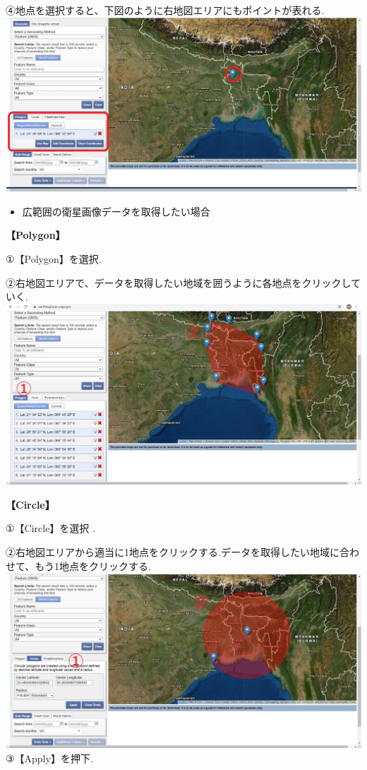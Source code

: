 \documentclass[
]{book}
\providecommand{\tightlist}{%
  \setlength{\itemsep}{0pt}\setlength{\parskip}{0pt}}
\begin{document}
④地点を選択すると、下図のように右地図エリアにもポイントが表れる.
\includegraphics{images/showarea.png}

\begin{itemize}
\tightlist
\item
  広範囲の衛星画像データを取得したい場合
\end{itemize}

\textbf{【Polygon】}　　

①【Polygon】を選択.

②右地図エリアで、データを取得したい地域を囲うように各地点をクリックしていく.\\
\includegraphics{images/polygon.png}

\textbf{【Circle】}

①【Circle】を選択 .

②右地図エリアから適当に1地点をクリックする.データを取得したい地域に合わせて、もう1地点をクリックする.\\
\includegraphics{images/circle1.png}
③【Apply】を押下.
\end{document}
